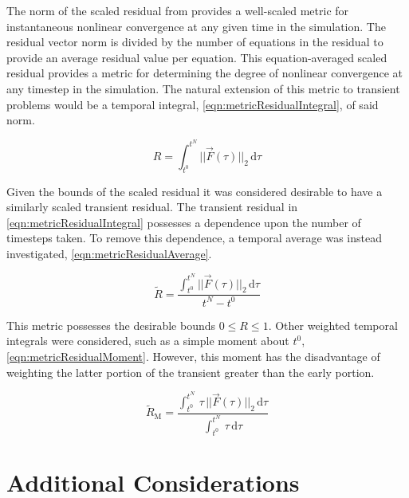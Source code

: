 The norm of the scaled residual from  provides a well-scaled metric for instantaneous nonlinear convergence at any given time in the simulation.
The residual vector norm is divided by the number of equations in the residual to provide an average residual value per equation.
This equation-averaged scaled residual provides a metric for determining the degree of nonlinear convergence at any timestep in the simulation.
The natural extension of this metric to transient problems would be a temporal integral, \eqref{eqn:metricResidualIntegral}, of said norm.

\begin{equation}
\label{eqn:metricResidualIntegral}
R = \int_{t^{0}}^{t^{N}} ||\vec{F}(\tau)||_2 \,\mathrm{d} \tau
\end{equation}

Given the bounds of the scaled residual it was considered desirable to have a similarly scaled transient residual.
The transient residual in \eqref{eqn:metricResidualIntegral} possesses a dependence upon the number of timesteps taken.
To remove this dependence, a temporal average was instead investigated, \eqref{eqn:metricResidualAverage}.

\begin{equation}
\label{eqn:metricResidualAverage}
\tilde{R} = \frac{\int_{t^{0}}^{t^{N}} ||\vec{F}(\tau)||_2 \,\mathrm{d} \tau}{t^{N} - t^{0}}
\end{equation}

This metric possesses the desirable bounds $0 \leq R \leq 1$.
Other weighted temporal integrals were considered, such as a simple moment about $t^{0}$, \eqref{eqn:metricResidualMoment}.
However, this moment has the disadvantage of weighting the latter portion of the transient greater than the early portion.

\begin{equation}
\label{eqn:metricResidualMoment}
\tilde{R}_{\text{M}} = \frac{\int_{t^{0}}^{t^{N}} \,\tau\,||\vec{F}(\tau)||_2 \,\mathrm{d} \tau}{\int_{t^{0}}^{t^{N}} \,\tau \,\mathrm{d} \tau}
\end{equation}

\section{Additional Considerations}
\label{sect:miscConcerns}

